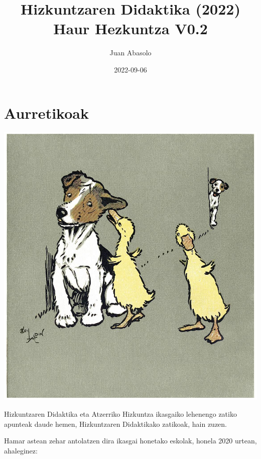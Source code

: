 \documentclass[
]{book}
\title{Hizkuntzaren Didaktika (2022) Haur Hezkuntza V0.2}
\author{Juan Abasolo}
\date{2022-09-06}
\begin{document}
\maketitle

{
\setcounter{tocdepth}{1}
\tableofcontents
}
\hypertarget{Aurretikoak}{%
\chapter*{Aurretikoak}\label{Aurretikoak}}

\includegraphics{assets/scare-quacks-1200.jpg}

Hizkuntzaren Didaktika eta Atzerriko Hizkuntza ikasgaiko lehenengo zatiko apunteak daude hemen, Hizkuntzaren Didaktikako zatikoak, hain zuzen.

Hamar astean zehar antolatzen dira ikasgai honetako eskolak, honela 2020 urtean, ahaleginez:
\end{document}
